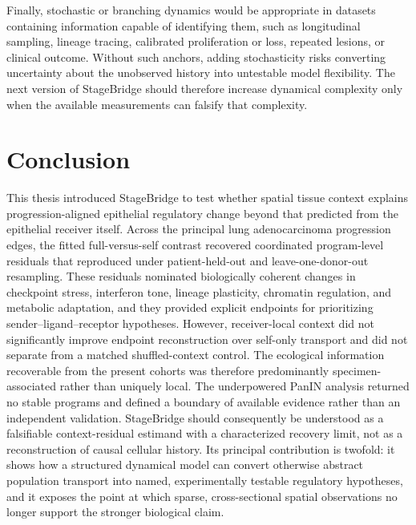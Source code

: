Finally, stochastic or branching dynamics would be appropriate in datasets containing information capable of identifying them, such as longitudinal sampling, lineage tracing, calibrated proliferation or loss, repeated lesions, or clinical outcome. Without such anchors, adding stochasticity risks converting uncertainty about the unobserved history into untestable model flexibility. The next version of StageBridge should therefore increase dynamical complexity only when the available measurements can falsify that complexity.

\section{Conclusion}
\label{sec:discussion-conclusion}

This thesis introduced StageBridge to test whether spatial tissue context explains progression-aligned epithelial regulatory change beyond that predicted from the epithelial receiver itself. Across the principal lung adenocarcinoma progression edges, the fitted full-versus-self contrast recovered coordinated program-level residuals that reproduced under patient-held-out and leave-one-donor-out resampling. These residuals nominated biologically coherent changes in checkpoint stress, interferon tone, lineage plasticity, chromatin regulation, and metabolic adaptation, and they provided explicit endpoints for prioritizing sender--ligand--receptor hypotheses. However, receiver-local context did not significantly improve endpoint reconstruction over self-only transport and did not separate from a matched shuffled-context control. The ecological information recoverable from the present cohorts was therefore predominantly specimen-associated rather than uniquely local. The underpowered PanIN analysis returned no stable programs and defined a boundary of available evidence rather than an independent validation. StageBridge should consequently be understood as a falsifiable context-residual estimand with a characterized recovery limit, not as a reconstruction of causal cellular history. Its principal contribution is twofold: it shows how a structured dynamical model can convert otherwise abstract population transport into named, experimentally testable regulatory hypotheses, and it exposes the point at which sparse, cross-sectional spatial observations no longer support the stronger biological claim.

